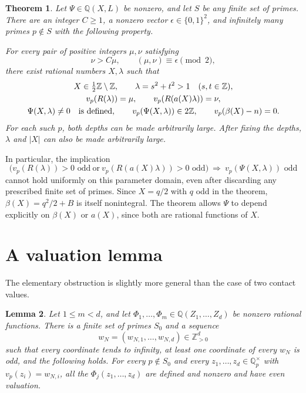 \documentclass[11pt,a4paper]{article}
\newtheorem{theorem}{Theorem}[section]
\newtheorem{lemma}[theorem]{Lemma}
\theoremstyle{remark}\newtheorem{remark}[theorem]{Remark}
\newcommand{\Q}{\mathbb Q}\newcommand{\Z}{\mathbb Z}
\begin{document}
\begin{theorem}\label{thm:main}
Let \(\Psi\in\Q(X,L)\) be nonzero, and let \(S\) be any finite
set of primes. There are an integer \(C\ge1\), a nonzero vector
\(\epsilon\in\{0,1\}^2\), and infinitely many primes \(p\notin S\)
with the following property.

For every pair of positive integers \(\mu,\nu\) satisfying
\[
                  \nu>C\mu,\qquad
                  (\mu,\nu)\equiv\epsilon\pmod2,
\]
there exist rational numbers \(X,\lambda\) such that
\begin{gather}
 X\in\tfrac12\Z\setminus\Z,\qquad
 \lambda=s^2+t^2>1\quad(s,t\in\Z),                                      \label{eq:domain}\\
 v_p(R(\lambda))=\mu,\qquad v_p(R(a(X)\lambda))=\nu,                    \label{eq:depths}\\
 \Psi(X,\lambda)\ne0\quad\hbox{is defined},\qquad
 v_p(\Psi(X,\lambda))\in2\Z,\qquad
 v_p(\beta(X)-n)=0.                                                     \label{eq:miss}
\end{gather}
For each such \(p\), both depths can be made arbitrarily large.
After fixing the depths, \(\lambda\) and \(|X|\) can also be made
arbitrarily large.
\end{theorem}

In particular, the implication
\[
 \bigl(v_p(R(\lambda))>0\text{ odd}\ \text{or}\
       v_p(R(a(X)\lambda))>0\text{ odd}\bigr)
 \ \Longrightarrow\
 v_p(\Psi(X,\lambda))\text{ odd}
\]
cannot hold uniformly on this parameter domain, even after
discarding any prescribed finite set of primes.
Since \(X=q/2\) with \(q\) odd in the theorem,
\(\beta(X)=q^2/2+B\) is itself nonintegral.
The theorem allows \(\Psi\) to depend explicitly on \(\beta(X)\)
or \(a(X)\), since both are rational functions of \(X\).

\section{A valuation lemma}

The elementary obstruction is slightly more general than the
case of two contact values.

\begin{lemma}\label{lem:parity}
Let \(1\le m<d\), and let
\(\Phi_1,\ldots,\Phi_m\in\Q(Z_1,\ldots,Z_d)\) be nonzero rational
functions. There is a finite set of primes \(S_0\) and a sequence
\[
        w_N=(w_{N,1},\ldots,w_{N,d})\in\Z_{>0}^d
\]
such that every coordinate tends to infinity, at least one
coordinate of every \(w_N\) is odd, and the following holds.
For every \(p\notin S_0\) and every
\(z_1,\ldots,z_d\in\Q_p^\times\) with
\(v_p(z_i)=w_{N,i}\), all the \(\Phi_j(z_1,\ldots,z_d)\)
are defined and nonzero and have even valuation.
\end{lemma}
\end{document}
